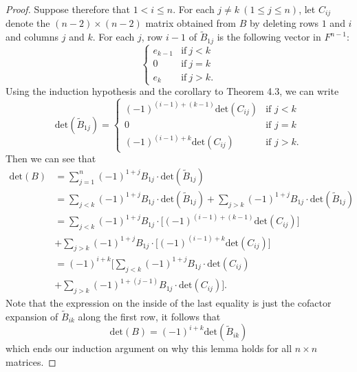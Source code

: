 \begin{proof}
    Suppose therefore that \( 1 < i \leq  n \). For each \( j \neq k  \ (1 \leq j \leq n )\), let \( {C}_{ij} \) denote the \( (n-2) \times (n-2) \) matrix obtained from \( B  \) by deleting rows \( 1  \) and \( i  \) and columns \( j  \) and \( k  \). For each \( j \), row \( i - 1  \) of \( {\tilde{B}}_{1j} \) is the following vector in \( F^{n-1} \):
    \[  
    \begin{cases}
        {e}_{k-1}  &\text{if} \ j < k \\ 
        0  &\text{if} \  j = k \\
        {e}_{k}  &\text{if} \ j > k. 
    \end{cases} \]
    Using the induction hypothesis and the corollary to Theorem 4.3, we can write
    \[  \text{det}({\tilde{B}}_{1j}) = 
    \begin{cases}
        (-1)^{(i-1) + (k-1)} \text{det}({C}_{ij}) &\text{if } j < k \\ 
        0  &\text{if } j = k \\
        (-1)^{(i-1) + k} \text{det}({C}_{ij}) &\text{if } j > k.
    \end{cases} \]
    Then we can see that
    \begin{align*}
        \text{det}(B) &= \sum_{ j=1 }^{ n } (-1)^{1+j} {B}_{1j} \cdot \text{det}({\tilde{B}}_{1j}) \\
                      &= \sum_{ j < k  }^{  } (-1)^{1+j} {B}_{1j} \cdot \text{det}({\tilde{B}}_{1j}) + \sum_{ j > k  }^{  } (-1)^{1+j} {B}_{1j} \cdot \text{det}({\tilde{B}}_{1j}) \\ 
                      &= \sum_{ j < k  }^{  } (-1)^{1+j} {B}_{1j} \cdot \Big[ (-1)^{(i-1) + (k-1)} \text{det}({C}_{ij})\Big] \\
                      &+ \sum_{ j > k  }^{  } (-1)^{1+j} {B}_{1j} \cdot  \Big[ (-1)^{(i-1) + k } \text{det}({C}_{ij})\Big] \\
                      &=  (-1)^{i+k} \Bigg[ \sum_{ j < k  }^{  } (-1)^{1 + j} {B}_{1j} \cdot \text{det}({C}_{ij}) \\ 
                      &+ \sum_{ j > k  }^{  } (-1)^{1 + (j-1)}  {B}_{1j} \cdot \text{det}({C}_{ij})\Bigg].
    \end{align*}
    Note that the expression on the inside of the last equality is just the cofactor expansion of \( {\tilde{B}}_{ik} \) along the first row, it follows that
    \[  \text{det}(B) = (-1)^{i + k} \text{det}({\tilde{B}}_{ik}) \]
    which ends our induction argument on why this lemma holds for all \( n \times n  \) matrices.
\end{proof}

